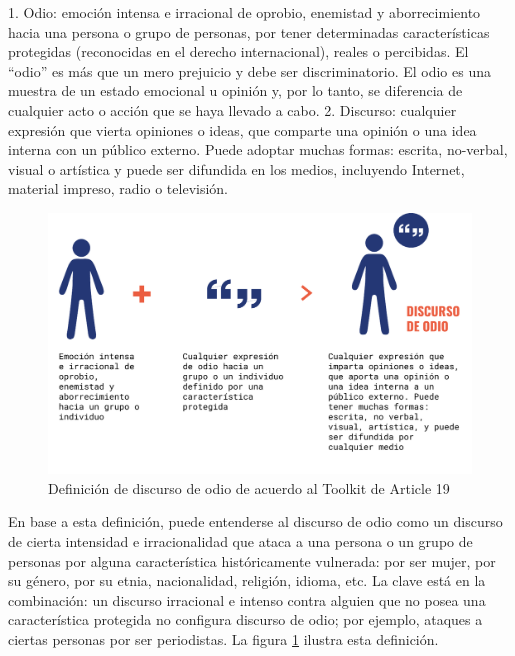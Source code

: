 \begin{displayquote}
    1. Odio: emoción intensa e irracional de oprobio, enemistad y aborrecimiento hacia una persona o grupo de personas, por tener determinadas características protegidas (reconocidas en el derecho internacional), reales o percibidas. El “odio” es más que un mero prejuicio y debe ser discriminatorio. El odio es una muestra de un estado emocional u opinión y, por lo tanto, se diferencia de cualquier acto o acción que se haya llevado a cabo.
    2. Discurso: cualquier expresión que vierta opiniones o ideas, que comparte una opinión o una idea interna con un público externo. Puede adoptar muchas formas: escrita, no-verbal, visual o artística y puede ser difundida en los medios, incluyendo Internet, material impreso, radio o televisión.
\end{displayquote}


\begin{figure}[t]
    \centering
    \includegraphics[width=\textwidth]{img/discurso_de_odio.pdf}
    \caption{Definición de discurso de odio de acuerdo al Toolkit de Article 19}
    \label{fig:hate_speech_definition_article_19}
\end{figure}


En base a esta definición, puede entenderse al discurso de odio como un discurso de cierta intensidad e irracionalidad que ataca a una persona o un grupo de personas por alguna característica históricamente vulnerada: por ser mujer, por su género, por su etnia, nacionalidad, religión, idioma, etc. La clave está en la combinación: un discurso irracional e intenso contra alguien que no posea una característica protegida no configura discurso de odio; por ejemplo, ataques a ciertas personas por ser periodistas. La figura \ref{fig:hate_speech_definition_article_19} ilustra esta definición.

